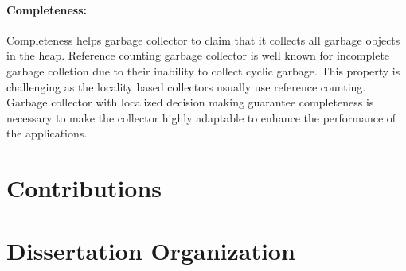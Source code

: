 \paragraph{Completeness:}
	Completeness helps garbage collector to claim that it collects all garbage objects in the heap. Reference counting garbage collector is well known for incomplete garbage colletion due to their inability to collect cyclic garbage. This property is challenging as the locality based collectors usually use reference counting. Garbage collector with localized decision making guarantee completeness is necessary to make the collector highly adaptable to enhance the performance of the applications.
\section{Contributions}
\label{intro:contr}
\section{Dissertation Organization}
\label{intro:do}